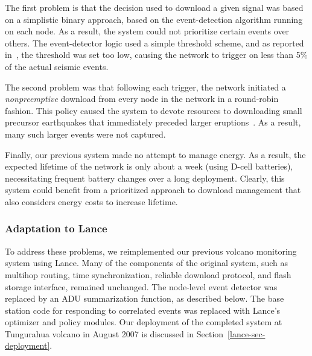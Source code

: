 The first problem is that the decision used to download a given signal 
was based on a simplistic binary approach, based on the event-detection 
algorithm running on each node. As a result, the system could not 
prioritize certain events over others. The event-detector logic used 
a simple threshold scheme, and as reported in~\cite{volcano-osdi06}, 
the threshold was set too low, causing the network to trigger on less 
than 5\% of the actual seismic events.


The second problem was that following each trigger, the network 
initiated a {\em nonpreemptive} download from every node in the
network in a round-robin fashion. This policy caused 
the system to devote resources to downloading small precursor earthquakes 
that immediately preceded larger eruptions~\cite{volcano-osdi06}. 
As a result, many such larger events were not captured. 

Finally, our previous system made no attempt to manage energy. 
As a result, the expected lifetime of the
network is only about a week (using D-cell batteries), necessitating
frequent battery changes over a long deployment.
Clearly, this system could benefit from a prioritized approach to
download management that also considers energy costs to increase
lifetime.

\subsubsection{Adaptation to Lance}

To address these problems, we reimplemented our previous volcano
monitoring system using Lance. Many of the components of the original system,
such as multihop routing, time synchronization, reliable download
protocol, and flash storage interface, remained unchanged. 
The node-level event detector was replaced by an ADU summarization function,
as described below. The base station code for responding to
correlated events was replaced with Lance's optimizer and
policy modules. Our deployment of the completed system at Tungurahua
volcano in August 2007 is discussed in Section~\ref{lance-sec-deployment}.

